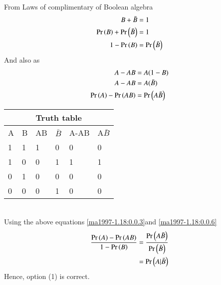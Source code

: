 From Laws of complimentary of Boolean algebra
 \begin{align}
     B + \bar{B} &= 1\\
     \Pr\left(B\right) + \Pr\left(\bar{B}\right) &=1\\
    1 -\Pr\left(B\right) &=\Pr\left(\bar{B}\right) \label{ma1997-1.18:0.0.3}
\end{align}
And also as
\begin{align}
    A -AB &= A(1-B)\\
   A-AB &=A(\bar{B}) \\
    \Pr\left(A\right) - \Pr\left(AB\right) &=\Pr\left(A\bar{B}\right) \label{ma1997-1.18:0.0.6}
\end{align}
\renewcommand{\arraystretch}{1.3}
\begin{table}[h!]
    \centering
    \begin{tabular}{ |p{1cm}|p{1cm}|p{1cm}|p{1cm}|p{1.5cm}|p{1cm}|}
 \hline
  \multicolumn{6}{|c|}{Truth table}\\[0.5ex]                     
 \hline
 \hline
  A &  B & AB & ${\bar{B}}$ & A-AB & A${\bar{B}}$ \\[0.5ex] 
 \hline
 1 & 1 & 1 & 0 & 0 & 0\\
 1 & 0 & 0 & 1 & 1 & 1\\
 0 & 1 & 0 & 0 & 0 & 0\\
 0 & 0 & 0 & 1 & 0 & 0\\
 \hline
\end{tabular}
\end{table}
\\
 Using the above equations \eqref{ma1997-1.18:0.0.3}and \eqref{ma1997-1.18:0.0.6}
 \begin{align}
     \dfrac{\Pr\left(A\right)-\Pr\left(A B\right)}{1-\Pr\left(B\right)} &= \dfrac{\Pr\left(A\bar{B}\right)}{\Pr\left(\bar{B}\right)} \\
     &=\Pr\left(A|\bar{B}\right)
 \end{align}
 Hence, option (1) is correct. 